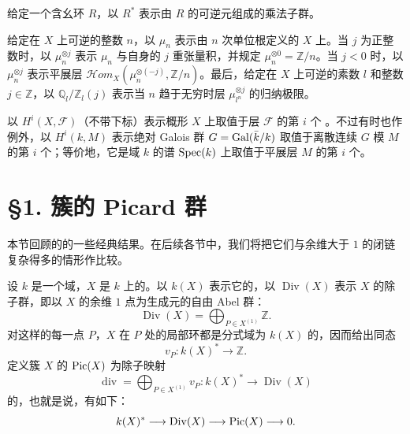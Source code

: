 给定一个含幺环 $R$，以 $R^*$ 表示由 $R$ 的可逆元组成的乘法子群。

给定在 $X$ 上可逆的整数 $n$，以 $\mu_n$ 表示由 $n$ 次单位根定义的 $X$ 上。当 $j$ 为正整数时，以 $\mu_n^{\otimes j}$ 表示 $\mu_n$ 与自身的 $j$ 重张量积，并规定 $\mu_n^{\otimes0}=\mathbb Z/n$。当 $j<0$ 时，以 $\mu_n^{\otimes j}$ 表示平展层 $\mathcal Hom_X(\mu_n^{\otimes(-j)},\mathbb Z/n)$。最后，给定在 $X$ 上可逆的素数 $l$ 和整数 $j\in\mathbb Z$，以 $\mathbb Q_l/\mathbb Z_l(j)$ 表示当 $n$ 趋于无穷时层 $\mu_{l^n}^{\otimes j}$ 的归纳极限。

以 $H^i(X,\mathcal F)$（不带下标）表示概形 $X$ 上取值于层 $\mathcal F$ 的第 $i$ 个 。不过有时也作例外，以 $H^i(k,M)$ 表示绝对 Galois 群 $G=\operatorname{Gal}(\bar k/k)$ 取值于离散连续 $G$ 模 $M$ 的第 $i$ 个；等价地，它是域 $k$ 的谱 $\operatorname{Spec}(k)$ 上取值于平展层 $M$ 的第 $i$ 个。

\section*{§1. 簇的 Picard 群}
本节回顾的的一些经典结果。在后续各节中，我们将把它们与余维大于 $1$ 的闭链复杂得多的情形作比较。

设 $k$ 是一个域，$X$ 是 $k$ 上的。以 $k(X)$ 表示它的，以 $\operatorname{Div}(X)$ 表示 $X$ 的除子群，即以 $X$ 的余维 $1$ 点为生成元的自由 Abel 群：
\[
\operatorname{Div}(X)=\bigoplus_{P\in X^{(1)}}\mathbb Z.
\]
对这样的每一点 $P$，$X$ 在 $P$ 处的局部环都是分式域为 $k(X)$ 的，因而给出同态
\[
v_P:k(X)^*\longrightarrow\mathbb Z.
\]
定义簇 $X$ 的 $\operatorname{Pic}(X)$ 为除子映射
\[
\operatorname{div}=\bigoplus_{P\in X^{(1)}}v_P:k(X)^*\longrightarrow\operatorname{Div}(X)
\]
的，也就是说，有如下：
\[
k(X)^*\longrightarrow\operatorname{Div}(X)\longrightarrow\operatorname{Pic}(X)\longrightarrow0.
\]

